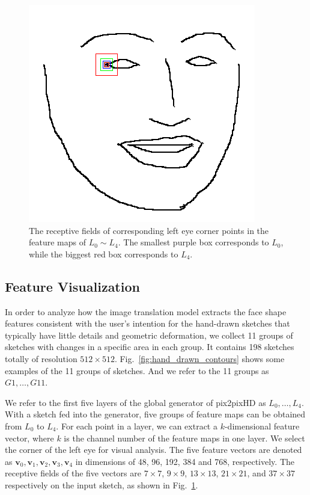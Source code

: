 \documentclass[10pt,twocolumn,letterpaper]{article}
\begin{document}
\begin{figure}[htbp]
	\begin{center}
		\includegraphics[width=0.2 \textwidth]{receptive_field.png}
	\end{center}
	\caption{The receptive fields of corresponding left eye corner points in the feature maps of $L_0\sim L_4$. The smallest purple box corresponds to $L_0$, while the biggest red box corresponds to $L_4$. }
	\label{fig:receptive}
\end{figure}



\subsection{Feature Visualization}\label{sec:visualize}



In order to analyze how the image translation model extracts the face shape features consistent with the user's intention for the hand-drawn sketches that typically have little details and geometric deformation, we collect 11 groups of sketches with changes in a specific area in each group. It contains 198 sketches totally of resolution $512\times512$. Fig.~\ref{fig:hand_drawn_contours} shows some examples of the 11 groups of sketches. And we refer to the 11 groups as $G1,\ldots,G11$.

We refer to the first five layers of the global generator of pix2pixHD as $L_0,\ldots,L_4$. 
With a sketch fed into the generator, five groups of feature maps can be obtained from $L_0$ to $L_4$.
For each point in a layer, we can extract a $k$-dimensional feature vector, where $k$ is the channel number of the feature maps in one layer.
We select the corner of the left eye for visual analysis. 
The five feature vectors are denoted as $\boldsymbol{v}_0,\boldsymbol{v}_1,\boldsymbol{v}_2,\boldsymbol{v}_3,\boldsymbol{v}_4$ in dimensions of 48, 96, 192, 384 and 768, respectively. 
The receptive fields of the five vectors are $7\times7$, $9\times9$, $13\times13$, $21\times21$, and $37\times37$ respectively on the input sketch, as shown in Fig.~\ref{fig:receptive}. 
\end{document}
